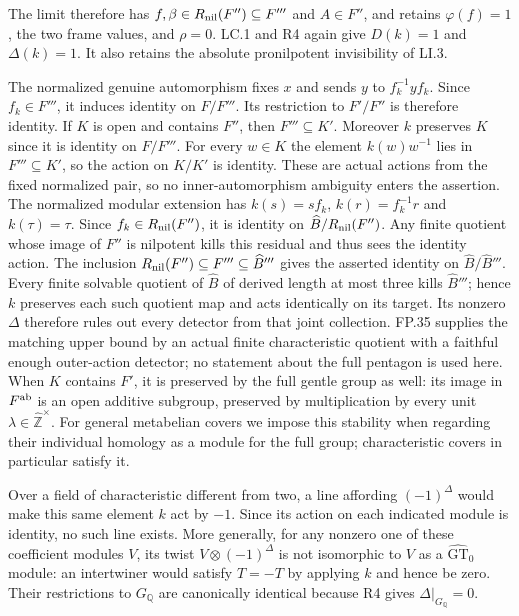 The limit therefore has $f,\beta\in R_{\rm nil}(F'')\subseteq F'''$
and $A\in F''$, and retains
$\varphi(f)=1$, the two frame values, and $\rho=0$.
LC.1 and R4 again give $D(k)=1$ and $\Delta(k)=1$.
It also retains the absolute pronilpotent invisibility of LI.3.

The normalized genuine automorphism fixes $x$ and sends
$y$ to $f_k^{-1}yf_k$. Since $f_k\in F'''$, it induces identity
on $F/F'''$. Its restriction to $F'/F''$ is therefore identity.
If $K$ is open and contains $F''$, then $F'''\subseteq K'$.
Moreover $k$ preserves $K$ since it is identity on $F/F'''$.
For every $w\in K$ the element $k(w)w^{-1}$ lies in
$F'''\subseteq K'$, so the action on $K/K'$ is identity.
These are actual actions from the fixed normalized pair, so
no inner-automorphism ambiguity enters the assertion.
The normalized modular extension has
$k(s)=sf_k$, $k(r)=f_k^{-1}r$ and $k(\tau)=\tau$.
Since $f_k\in R_{\rm nil}(F'')$, it is identity on
$\widehat B/R_{\rm nil}(F'')$. Any finite quotient whose
image of $F''$ is nilpotent kills this residual and thus sees
the identity action. The inclusion
$R_{\rm nil}(F'')\subseteq F'''\subseteq\widehat B'''$
gives the asserted identity on $\widehat B/\widehat B'''$.
Every finite solvable quotient
of $\widehat B$ of derived length at most three kills
$\widehat B'''$; hence $k$ preserves each such quotient map
and acts identically on its target. Its nonzero $\Delta$
therefore rules out every detector from that joint collection.
FP.35 supplies the matching upper bound by an actual finite
characteristic quotient with a faithful enough outer-action
detector; no statement about the full pentagon is used here.
When $K$ contains $F'$, it is preserved by the full gentle
group as well: its image in $F^{\rm ab}$ is an open additive subgroup,
preserved by multiplication by every unit
$\lambda\in\widehat{\mathbb Z}^{\times}$.
For general metabelian covers we impose this stability when
regarding their individual homology as a module for the full
group; characteristic covers in particular satisfy it.

Over a field of characteristic different from two, a line
affording $(-1)^\Delta$ would make this same element $k$
act by $-1$. Since its action on each indicated module is
identity, no such line exists. More generally, for any nonzero
one of these coefficient modules $V$, its twist
$V\otimes(-1)^\Delta$ is not isomorphic to $V$ as a
$\widehat{\mathrm{GT}}_0$ module: an intertwiner would satisfy
$T=-T$ by applying $k$ and hence be zero. Their restrictions
to $G_{\mathbb Q}$ are canonically identical because R4
gives $\Delta|_{G_{\mathbb Q}}=0$.

